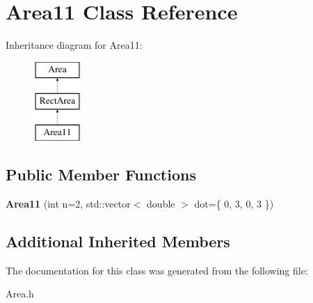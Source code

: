 \hypertarget{class_area11}{}\section{Area11 Class Reference}
\label{class_area11}
Inheritance diagram for Area11\+:\begin{figure}[H]
\begin{center}
\leavevmode
\includegraphics[height=3.000000cm]{class_area11}
\end{center}
\end{figure}
\subsection*{Public Member Functions}
\begin{DoxyCompactItemize}
\item 
\mbox{\label{class_area11_aac2e4a6490509ad45aadf710ee10e91e}} 
{\bfseries Area11} (int n=2, std\+::vector$<$ double $>$ dot=\{ 0, 3, 0, 3 \})
\end{DoxyCompactItemize}
\subsection*{Additional Inherited Members}


The documentation for this class was generated from the following file\+:\begin{DoxyCompactItemize}
\item 
Area.\+h\end{DoxyCompactItemize}
